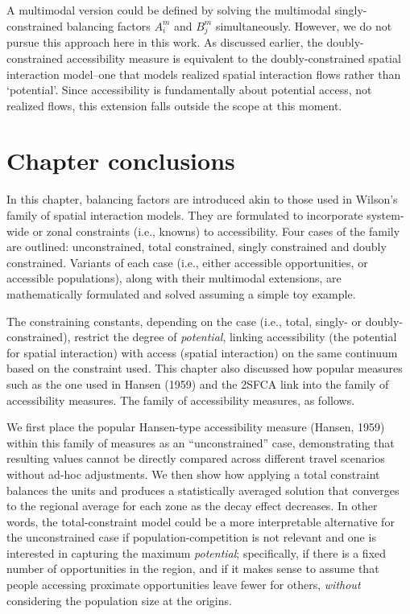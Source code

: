 \documentclass[
11pt, %
oneside, %
english, %
singlespacing, %
]{macthesis} %
\begin{document}
A multimodal version could be defined by solving the multimodal singly-constrained balancing factors \(A_i^m\) and \(B_j^m\) simultaneously. However, we do not pursue this approach here in this work. As discussed earlier, the doubly-constrained accessibility measure is equivalent to the doubly-constrained spatial interaction model--one that models realized spatial interaction flows rather than `potential'. Since accessibility is fundamentally about potential access, not realized flows, this extension falls outside the scope at this moment.

\section{Chapter conclusions}\label{chapter-conclusions}

In this chapter, balancing factors are introduced akin to those used in Wilson's family of spatial interaction models. They are formulated to incorporate system-wide or zonal constraints (i.e., knowns) to accessibility. Four cases of the family are outlined: unconstrained, total constrained, singly constrained and doubly constrained. Variants of each case (i.e., either accessible opportunities, or accessible populations), along with their multimodal extensions, are mathematically formulated and solved assuming a simple toy example.

The constraining constants, depending on the case (i.e., total, singly- or doubly- constrained), restrict the degree of \emph{potential}, linking accessibility (the potential for spatial interaction) with access (spatial interaction) on the same continuum based on the constraint used. This chapter also discussed how popular measures such as the one used in Hansen (1959) and the 2SFCA link into the family of accessibility measures. The family of accessibility measures, as follows.

We first place the popular Hansen-type accessibility measure (Hansen, 1959) within this family of measures as an ``unconstrained'' case, demonstrating that resulting values cannot be directly compared across different travel scenarios without ad-hoc adjustments. We then show how applying a total constraint balances the units and produces a statistically averaged solution that converges to the regional average for each zone as the decay effect decreases. In other words, the total-constraint model could be a more interpretable alternative for the unconstrained case if population-competition is not relevant and one is interested in capturing the maximum \emph{potential}; specifically, if there is a fixed number of opportunities in the region, and if it makes sense to assume that people accessing proximate opportunities leave fewer for others, \emph{without} considering the population size at the origins.
\end{document}
